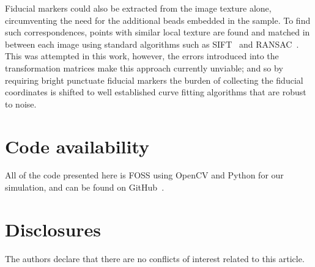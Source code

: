 \documentclass{osa-article}
\begin{document}
Fiducial markers could also be extracted from the image texture alone, circumventing the need for the additional beads embedded in the sample.
To find such correspondences, points with similar local texture are found and matched in between each image using standard algorithms such as SIFT~\cite{loweObjectRecognitionLocal1999} and RANSAC~\cite{fischlerRandomSampleConsensus1981}. %
This was attempted in this work, however, the errors introduced into the transformation matrices make this approach currently unviable; and so by requiring bright punctuate fiducial markers the burden of collecting the fiducial coordinates is shifted to well established curve fitting algorithms that are robust to noise.


\section*{Code availability}
All of the code presented here is FOSS using OpenCV and Python for our simulation, and can be found on GitHub~\cite{craig_russell_2020_4073437}.

\section*{Disclosures}
The authors declare that there are no conflicts of interest related to this article.

\onecolumn
\newpage
%
\end{document}
